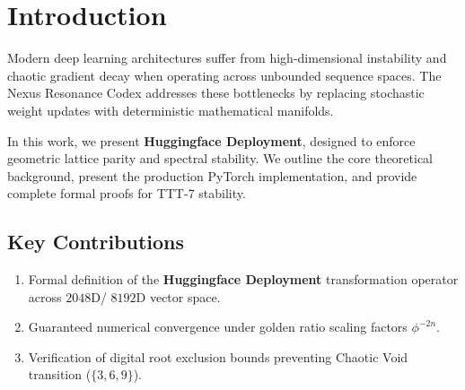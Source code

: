 \section{Introduction}
Modern deep learning architectures suffer from high-dimensional instability and chaotic gradient decay when operating across unbounded sequence spaces. The Nexus Resonance Codex addresses these bottlenecks by replacing stochastic weight updates with deterministic mathematical manifolds.

In this work, we present \textbf{Huggingface Deployment}, designed to enforce geometric lattice parity and spectral stability. We outline the core theoretical background, present the production PyTorch implementation, and provide complete formal proofs for TTT-7 stability.

\subsection{Key Contributions}
\begin{enumerate}[label=\textbf{\arabic*.}]
    \item Formal definition of the \textbf{Huggingface Deployment} transformation operator across $2048$D/ $8192$D vector space.
    \item Guaranteed numerical convergence under golden ratio scaling factors $\phi^{-2n}$.
    \item Verification of digital root exclusion bounds preventing Chaotic Void transition ($\{3, 6, 9\}$).
\end{enumerate}